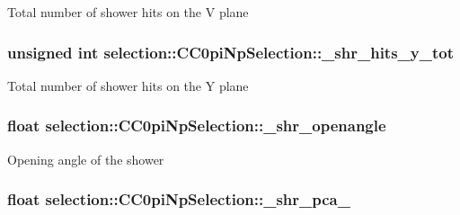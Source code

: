 Total number of shower hits on the V plane \hypertarget{classselection_1_1CC0piNpSelection_a6a43c3523af47860ad1682ebe14bb8e3}{
\subsubsection[{\-\_\-shr\-\_\-hits\-\_\-y\-\_\-tot}]{\setlength{\rightskip}{0pt plus 5cm}unsigned int selection\-::\-C\-C0pi\-Np\-Selection\-::\-\_\-shr\-\_\-hits\-\_\-y\-\_\-tot\hspace{0.3cm}{\ttfamily [private]}}}\label{classselection_1_1CC0piNpSelection_a6a43c3523af47860ad1682ebe14bb8e3}
Total number of shower hits on the Y plane \hypertarget{classselection_1_1CC0piNpSelection_a33b26acb3cdb05cb1b81800d8af48a03}{
\subsubsection[{\-\_\-shr\-\_\-openangle}]{\setlength{\rightskip}{0pt plus 5cm}float selection\-::\-C\-C0pi\-Np\-Selection\-::\-\_\-shr\-\_\-openangle\hspace{0.3cm}{\ttfamily [private]}}}\label{classselection_1_1CC0piNpSelection_a33b26acb3cdb05cb1b81800d8af48a03}
Opening angle of the shower \hypertarget{classselection_1_1CC0piNpSelection_a47b08d4ae98f51032f431873321914a5}{
\subsubsection[{\-\_\-shr\-\_\-pca\-\_\-0}]{\setlength{\rightskip}{0pt plus 5cm}float selection\-::\-C\-C0pi\-Np\-Selection\-::\-\_\-shr\-\_\-pca\-\_\hspace{0.3cm}{\ttfamily [private]}}}\label{classselection_1_1CC0piNpSelection_a47b08d4ae98f51032f431873321914a5}
